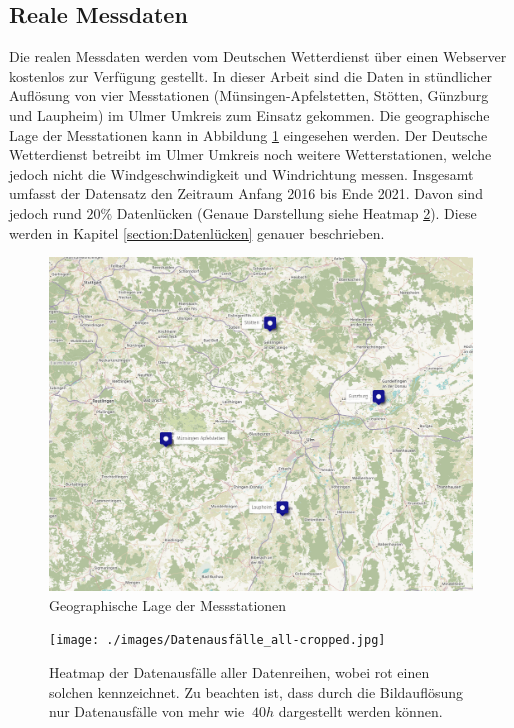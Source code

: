 \documentclass[
12pt, %
toc=listofnumbered, %
toc=chapterentrydotfill, %
numbers=noenddot, %
captions=tableheading, %
bibliography=numbered
]{scrreprt}
\let\Oldsubsection\subsection
\renewcommand{\subsection}{\FloatBarrier\Oldsubsection}
\begin{document}
\subsection{Reale Messdaten}\label{section:realeMessdaten}
Die realen Messdaten werden vom Deutschen Wetterdienst über einen Webserver kostenlos zur Verfügung gestellt. In dieser Arbeit sind die Daten in stündlicher Auflösung von vier Messtationen (Münsingen-Apfelstetten, Stötten, Günzburg und Laupheim) im Ulmer Umkreis zum Einsatz gekommen. Die geographische Lage der Messtationen kann in Abbildung \ref{fig:map} eingesehen werden. Der Deutsche Wetterdienst betreibt im Ulmer Umkreis noch weitere Wetterstationen, welche jedoch nicht die Windgeschwindigkeit und Windrichtung messen. Insgesamt umfasst der Datensatz den Zeitraum Anfang 2016 bis Ende 2021. Davon sind jedoch rund $20\%$ Datenlücken (Genaue Darstellung siehe Heatmap \ref{fig:heatmap}). Diese werden in Kapitel \ref{section:Datenlücken} genauer beschrieben. 

\begin{figure}[tph]
	\begin{center}
		\includegraphics[width=\textwidth]{./images/map.png}
		\caption{Geographische Lage der Messstationen \cite{2021_OpenStreetMap-Contributors_UMap}}
		\label{fig:map}
	\end{center}
\end{figure}

\begin{figure}[tph]
	\begin{center}
		\texttt{[image: ./images/Datenausfälle\_all-cropped.jpg]}
		\caption{Heatmap der Datenausfälle aller Datenreihen, wobei rot einen solchen kennzeichnet. Zu beachten ist, dass durch die Bildauflösung nur Datenausfälle von mehr wie $~40h$ dargestellt werden können.}
		\label{fig:heatmap}
	\end{center}
\end{figure}
\end{document}
